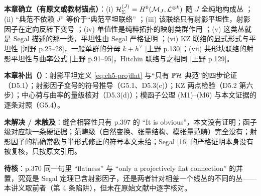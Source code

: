 \begin{boundary}
\textbf{本章确立（有原文或教材锚点）}：(i) $\mathcal{H}_\Sigma^{(J)}=H^0(\mathcal{M}_J,\mathcal{L}^{\otimes k})$ 随 $J$ 全纯地构成丛 ；(ii) “典范不依赖 $J$” 等价于“典范平坦联络” ；(iii) 该联络只有射影平坦性，射影因子在定向反转下变号 ；(iv) 单值性是纯粹拓扑的映射类群作用 ；(v) 这类丛就是 Segal 描述的那一类，平坦性由 Segal 严格证明 ；(vi) KZ 联络的显式形式与平坦性 [河野 p.25--28]，一般单群的分母 $k+h^\vee$ [上野 p.130]；(vii) 共形块联络的射影平坦性与曲率公式 [上野 p.91--95]，Hitchin 联络与之相同 [上野 p.129]。

\textbf{本章补出（\ours）}：射影平坦定义 \eqref{eq:ch5-projflat} 与“只有 $\mathbb P\mathcal{H}$ 典范”的四步论证（D5.1）；射影因子变号的符号推导（G5.1、D5.3(c)）；KZ 两点检验（D5.2 第六步）；中心荷与曲率的量级核对（D5.3(d)）；模函子公理 (M1)--(M6) 与本文证据的逐条对照（G5.4）。

\textbf{未解决 / 未触及}：缝合相容性只有 p.397 的 “It is obvious”，本文没有证明；函子级对应缺一条硬证据；范畴级（自然变换、张量结构、模张量范畴）完全没有；射影因子的精确常数与半形式修正的符号本文未给；Segal [16] 的严格证明本身没有被复核，只按原文引用。

\textbf{待核}：p.370 同一句里 “flatness” 与 “only a projectively flat connection” 的并置，究竟是 Segal 定理已含射影因子，还是两者针对相差一个线丛的不同的丛——本讲义取前者（第 4 条陷阱），但未在原始文献中逐字核对。
\end{boundary}



